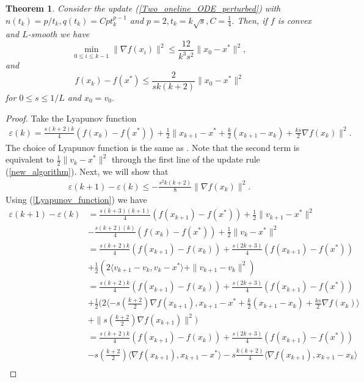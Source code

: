 \documentclass{article}
\theoremstyle{plain}
\newtheorem{thm}{\textbf{Theorem}}
\theoremstyle{definition}
\theoremstyle{remark}
\begin{document}
\begin{thm}\label{theorem4}
    Consider the update (\ref{Two_oneline_ODE_perturbed}) with $n(t_k)=p/t_k,q(t_k)=Cpt_k^{p-1}$ and $p=2,t_k=k\sqrt{s},C=\tfrac{1}{4}$. Then, if $f$ is convex and $L$-smooth we have
    $$\min_{0\leq i\leq k-1}\|\nabla f(x_i)\|^2 \leq \frac{12}{k^3s^2}\|x_0-x^*\|^2,$$
    and
    $$f(x_k)-f(x^*)\leq \frac{2}{sk(k+2)}\|x_0-x^*\|^2$$
    for $0\leq s\leq 1/L$ and $x_0=v_0$.
\end{thm}
\begin{proof}
    Take the Lyapunov function 
\begin{align}\label{Lyapunov_function}
    \varepsilon(k) = \frac{s(k+2)k}{4}(f(x_k)-f(x^*))+\frac{1}{2}\|x_{k+1}-x^*+\frac{k}{2}(x_{k+1}-x_k)+\frac{ks}{2}\nabla f(x_k)\|^2.
\end{align}
The choice of Lyapunov function is the same as \cite{Shi2021UnderstandingTA}. Note that the second term is equivalent to $\frac{1}{2}\|v_k-x^*\|^2$ through the first line of the update rule (\ref{new_algorithm}). Next, we will show that 
\begin{align}\label{Lyap_1}
    \varepsilon(k+1)-\varepsilon(k)\leq -\frac{s^2k(k+2)}{8}\|\nabla f(x_k)\|^2.
\end{align}
Using (\ref{Lyapunov_function}) we have
\begin{align}\label{Lyap_2}
    \varepsilon(k+1)-\varepsilon(k)&=\frac{s(k+3)(k+1)}{4}(f(x_{k+1})-f(x^*))+\frac{1}{2}\|v_{k+1}-x^*\|^2\nonumber\\
    & - \frac{s(k+2)(k)}{4}(f(x_{k})-f(x^*))+\frac{1}{2}\|v_{k}-x^*\|^2\nonumber\\
    &=\frac{s(k+2)k}{4}(f(x_{k+1})-f(x_k))+\frac{s(2k+3)}{4}(f(x_{k+1})-f(x^*))\nonumber\\
    &+\frac{1}{2}(2\langle v_{k+1}-v_k,v_k-x^* \rangle+\|v_{k+1}-v_k\|^2)\nonumber\\
    &= \frac{s(k+2)k}{4}(f(x_{k+1})-f(x_k))+\frac{s(2k+3)}{4}(f(x_{k+1})-f(x^*))\nonumber\\
    &+\frac{1}{2}(2\langle -s(\frac{k+2}{2})\nabla f(x_{k+1}),x_{k+1}-x^*+\frac{k}{2}(x_{k+1}-x_k)+\frac{ks}{2}\nabla f(x_k) \rangle \nonumber\\
    &+\|s(\frac{k+2}{2})\nabla f(x_{k+1})\|^2)\nonumber\\
    &= \frac{s(k+2)k}{4}(f(x_{k+1})-f(x_k))+\frac{s(2k+3)}{4}(f(x_{k+1})-f(x^*))\nonumber\\
    &-s(\frac{k+2}{2})\langle \nabla f(x_{k+1}),x_{k+1}-x^*\rangle-s\frac{k(k+2)}{4}\langle \nabla f(x_{k+1}),x_{k+1}-x_k\rangle\nonumber\\

\end{align}
\end{proof}
\end{document}

